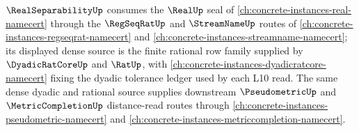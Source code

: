 $\RealSeparabilityUp$ consumes the $\RealUp$ seal of \autoref{ch:concrete-instances-real-namecert} through the $\RegSeqRatUp$ and $\StreamNameUp$ routes of \autoref{ch:concrete-instances-regseqrat-namecert} and \autoref{ch:concrete-instances-streamname-namecert}; its displayed dense source is the finite rational row family supplied by $\DyadicRatCoreUp$ and $\RatUp$, with \autoref{ch:concrete-instances-dyadicratcore-namecert} fixing the dyadic tolerance ledger used by each L10 read. The same dense dyadic and rational source supplies downstream $\PseudometricUp$ and $\MetricCompletionUp$ distance-read routes through \autoref{ch:concrete-instances-pseudometric-namecert} and \autoref{ch:concrete-instances-metriccompletion-namecert}.

